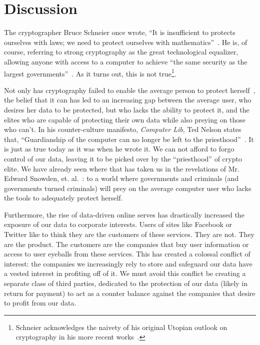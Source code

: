 \section{Discussion}

The cryptographer Bruce Schneier once wrote, ``It is insufficient to
protects ourselves with laws; we need to protect ourselves with
mathematics''~\cite{schneier1996applied}. He is, of course, referring
to strong cryptography as the great technological equalizer, allowing
anyone with access to a computer to achieve ``the same security as the
largest governments''~\cite{schneier2000secrets}. As it turns out,
this is not true\footnote{Schneier acknowledges the naivety of his
  original Utopian outlook on cryptography in his more recent
  works~\cite{schneier2000secrets}.}.

Not only has cryptography failed to enable the average person to
protect herself~\cite{green-challenge}, the belief that it can has led
to an increasing gap between the average user, who desires her data to
be protected, but who lacks the ability to protect it, and the elites
who are capable of protecting their own data while also preying on
those who can't. In his counter-culture manifesto, \textit{Computer
  Lib}, Ted Nelson states that, ``Guardianship of the computer can no
longer be left to the priesthood''~\cite{nelson1972computer}. It is
just as true today as it was when he wrote it. We can not afford to
forgo control of our data, leaving it to be picked over by the
``priesthood'' of crypto elite. We have already seen where that has
taken us in the revelations of Mr. Edward Snowden,
et. al.~\cite{GreenwaldPrism}: to a world where governments and
criminals (and governments turned criminals) will prey on the average
computer user who lacks the tools to adequately protect herself.

Furthermore, the rise of data-driven online serves has drastically
increased the exposure of our data to corporate interests. Users of
sites like Facebook or Twitter like to think they are the customers of
these services. They are not. They are the product. The customers are
the companies that buy user information or access to user eyeballs
from these services. This has created a colossal conflict of interest:
the companies we increasingly rely to store and safeguard our data
have a vested interest in profiting off of it. We must avoid this
conflict be creating a separate class of third parties, dedicated to
the protection of our data (likely in return for payment) to act as a
counter balance against the companies that desire to profit from our
data.

